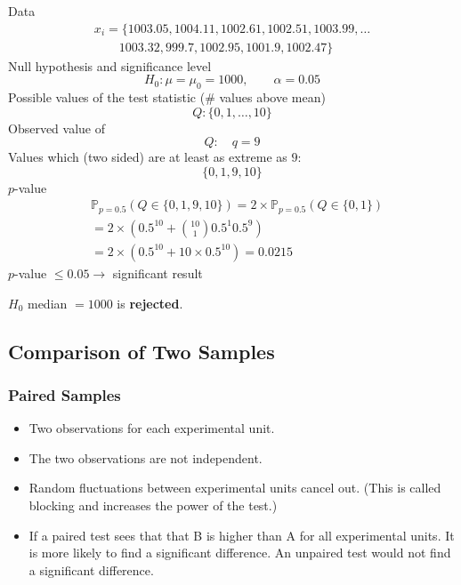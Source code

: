 \begin{examplesection}
    Data
    \noindent\begin{gather*}
        x_i = \{1003.05, 1004.11, 1002.61, 1002.51, 1003.99, \ldots \\
        \qquad 1003.32, 999.7, 1002.95, 1001.9, 1002.47\}
    \end{gather*}
    Null hypothesis and significance level
    \begin{equation*}
        H_0: \mu=\mu_0=1000, \qquad \alpha=0.05
    \end{equation*}
    Possible values of the test statistic ($\#$ values above mean)
    \begin{equation*}
        Q: \{0,1,\ldots,10\}
    \end{equation*}
    \newpar{}
    Observed value of
    \begin{equation*}
        Q: \quad q=9
    \end{equation*}
    \newpar{}
    Values which (two sided) are at least as extreme as $9$:
    \begin{equation*}
        \{0,1,9,10\}
    \end{equation*}
    \newpar{}
    $p$-value
    \begin{align*}
         & \mathbb{P}_{p=0.5}(Q\in\{0,1,9,10\})=2\times\mathbb{P}_{p=0.5}(Q\in\{0,1\}) \\
         & = 2\times\left(0.5^{10} + {10 \choose 1} 0.5^1 0.5^9\right)                 \\
         & = 2\times\left(0.5^{10}+ 10\times 0.5^{10}\right)= 0.0215
    \end{align*}
    $p$-value $\leq 0.05 \rightarrow$ significant result
    
    $H_0$ median $= 1000$ is \textbf{rejected}.
\end{examplesection}

\subsection{Comparison of Two Samples}


\subsubsection{Paired Samples}

\begin{itemize}
    \item Two observations for each experimental unit.
    \item The two observations are not independent.
    \item Random fluctuations between experimental units cancel out. (This is called blocking and increases the power of the test.)
    \item If a paired test sees that that B is higher than A for all experimental units. It is more likely to find a significant difference. An unpaired test would not find a significant difference.
\end{itemize}

